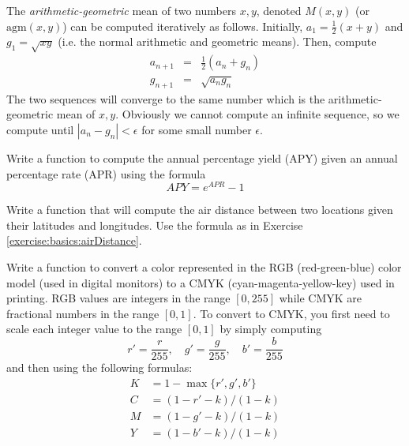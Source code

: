 \begin{exer}
The \emph{arithmetic-geometric} mean of two numbers $x, y$, denoted 
$M(x, y)$ (or $\mathrm{agm}(x, y)$) can be computed iteratively as 
follows.  Initially, $a_1 = \frac{1}{2}(x + y)$ and $g_1 = \sqrt{xy}$ (i.e. the 
normal arithmetic and geometric means).  Then, compute
  $$\begin{array}{rcl}
    a_{n+1} & = & \frac{1}{2}(a_n+g_n) \\
    g_{n+1} & = & \sqrt{a_n g_n}
    \end{array}$$
The two sequences will converge to the same number which is the arithmetic-geometric 
mean of $x, y$.  Obviously we cannot compute an infinite sequence, so we compute until
$|a_n - g_n| < \epsilon$ for some small number $\epsilon$.
\end{exer}

\begin{exer}
\label{exercise:functions:apr}
Write a function to compute the annual percentage yield (APY) given
an annual percentage rate (APR) using the formula 
  $$APY = e^{APR} - 1$$
\end{exer}

\begin{exer}
\label{exercise:functions:airDistance}
Write a function that will compute the air distance between two locations given their
latitudes and longitudes.  Use the formula as in Exercise \ref{exercise:basics:airDistance}.
\end{exer}

\begin{exer}
\label{exercise:functions:rgbToCMYK}
Write a function to convert a color represented in the RGB (red-green-blue) 
color model (used in digital monitors) to a CMYK (cyan-magenta-yellow-key) 
used in printing.  RGB values are integers in the range $[0, 255]$ while CMYK 
are fractional numbers in the range $[0, 1]$.  To convert to CMYK, you first need 
to scale each integer value to the range $[0, 1]$ by simply computing
  $$r' = \frac{r}{255}, \quad g' = \frac{g}{255}, \quad b' = \frac{b}{255}$$
and then using the following formulas:
\begin{align*}
K & = 1-\max\{r', g', b'\} \\
C & = (1-r'-k) / (1-k) \\
M & = (1-g'-k) / (1-k) \\
Y & = (1-b'-k) / (1-k) \\
\end{align*}
\end{exer}

